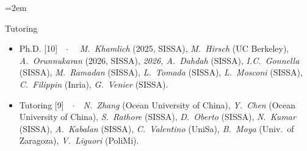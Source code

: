 \documentclass[
  usegeometry%
]{scrartcl}
\newcommand{\Description}[1]{\hangindent=2em\hangafter=0\noindent\raggedright\footnotesize{#1}\par\normalsize\vspace{1em}} %
\begin{document}
\begin{cv}{}
\Description{{\color{cyan} Tutoring}
\begin{itemize}
    \item[$\circ$] {\color{BrickRed}Ph.D.} [10]\ \ $\cdotp$\ \ \textit{ M.\ Khamlich} (2025, SISSA), \textit{M.\ Hirsch} (UC Berkeley), \textit{A.\ Orunnukaran} (2026, SISSA), \textit{2026, A.\ Dahdah} (SISSA), \textit{I.C.\ Gonnella} (SISSA), \textit{M.\ Ramadan} (SISSA), \textit{ L.\ Tomada} (SISSA), \textit{L.\ Mosconi} (SISSA), \textit{ C.\ Filippin} (Inria), \textit{G.\ Venier} (SISSA).
    \item[$\circ$] {\color{orange}Tutoring} [9]\ \ $\cdotp$\ \ \textit{N.\ Zhang} (Ocean University of China), \textit{Y.\ Chen} (Ocean University of China), \textit{S.\ Rathore} (SISSA), \textit{D.\ Oberto} (SISSA), \textit{N.\ Kumar} (SISSA), \textit{A.\ Kabalan} (SISSA), \textit{C.\ Valentino} (UniSa), \textit{B.\ Moya} (Univ.\ of Zaragoza), \textit{V.\ Liguori} (PoliMi).

\end{itemize}}
\end{cv}
\end{document}
